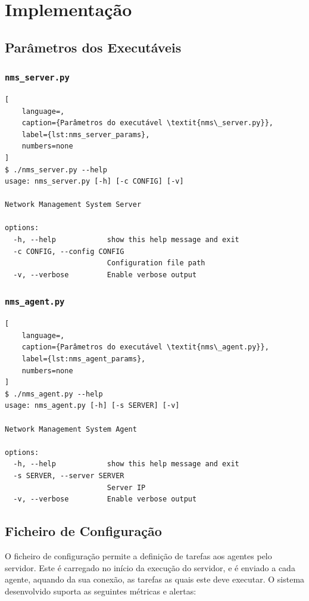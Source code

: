 \documentclass[a4paper,12pt]{scrreprt}
\begin{document}
\chapter{Implementação}

\section{Parâmetros dos Executáveis}

\subsection{\texttt{nms\_server.py}}

\begin{lstlisting}[
    language=,
    caption={Parâmetros do executável \textit{nms\_server.py}},
    label={lst:nms_server_params},
    numbers=none
]
$ ./nms_server.py --help
usage: nms_server.py [-h] [-c CONFIG] [-v]

Network Management System Server

options:
  -h, --help            show this help message and exit
  -c CONFIG, --config CONFIG
                        Configuration file path
  -v, --verbose         Enable verbose output
\end{lstlisting}

\subsection{\texttt{nms\_agent.py}}

\begin{lstlisting}[
    language=,
    caption={Parâmetros do executável \textit{nms\_agent.py}},
    label={lst:nms_agent_params},
    numbers=none
]
$ ./nms_agent.py --help
usage: nms_agent.py [-h] [-s SERVER] [-v]

Network Management System Agent

options:
  -h, --help            show this help message and exit
  -s SERVER, --server SERVER
                        Server IP
  -v, --verbose         Enable verbose output
\end{lstlisting}

\section{Ficheiro de Configuração}

O ficheiro de configuração permite a definição de tarefas aos agentes pelo servidor.
Este é carregado no início da execução do servidor, e é enviado a cada agente, aquando
da sua conexão, as tarefas as quais este deve executar.
O sistema desenvolvido suporta as seguintes métricas e alertas:
\end{document}
